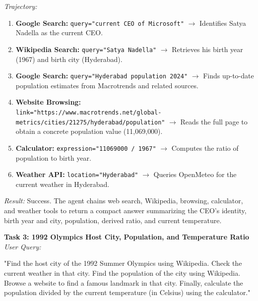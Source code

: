 \documentclass{article}
\begin{document}
\textit{Trajectory:}
\begin{enumerate}
    \item \textbf{Google Search:} \texttt{query="current CEO of Microsoft"} $\rightarrow$ Identifies Satya Nadella as the current CEO.
    \item \textbf{Wikipedia Search:} \texttt{query="Satya Nadella"} $\rightarrow$ Retrieves his birth year (1967) and birth city (Hyderabad).
    \item \textbf{Google Search:} \texttt{query="Hyderabad population 2024"} $\rightarrow$ Finds up-to-date population estimates from Macrotrends and related sources.
    \item \textbf{Website Browsing:} \\ \texttt{link="https://www.macrotrends.net/global-metrics/cities/21275/hyderabad/population"} $\rightarrow$ Reads the full page to obtain a concrete population value (11{,}069{,}000).
    \item \textbf{Calculator:} \texttt{expression="11069000 / 1967"} $\rightarrow$ Computes the ratio of population to birth year.
    \item \textbf{Weather API:} \texttt{location="Hyderabad"} $\rightarrow$ Queries OpenMeteo for the current weather in Hyderabad.
\end{enumerate}

\textit{Result:} Success. The agent chains web search, Wikipedia, browsing, calculator, and weather tools to return a compact answer summarizing the CEO's identity, birth year and city, population, derived ratio, and current temperature.

\textbf{Task 3: 1992 Olympics Host City, Population, and Temperature Ratio} \\
\textit{User Query:} 

"Find the host city of the 1992 Summer Olympics using Wikipedia. Check the current weather in that city. Find the population of the city using Wikipedia. Browse a website to find a famous landmark in that city. Finally, calculate the population divided by the current temperature (in Celsius) using the calculator." \\
\end{document}
